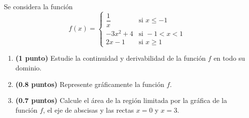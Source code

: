 
Se considera la función
\[
f(x)=\begin{cases}
\dfrac{1}{x} & \text{si }x\leq -1\\[3pt]
-3x^2+4 & \text{si }-1<x<1\\
2x-1 & \text{si }x\geq 1
\end{cases}
\]
\begin{enumerate}[label=\alph*)]
  \item \textbf{(1 punto)} Estudie la continuidad y derivabilidad de la
  función $f$ en todo su dominio.
  \item \textbf{(0.8 puntos)} Represente gráficamente la función $f$.
  \item \textbf{(0.7 puntos)} Calcule el área de la región limitada por la
  gráfica de la función $f$, el eje de abscisas y las rectas $x=0$ y $x=3$.
\end{enumerate}
